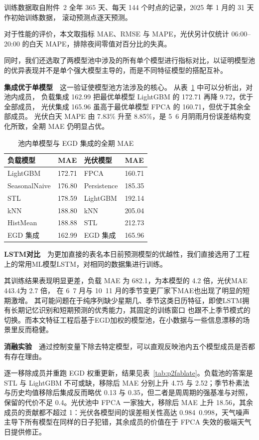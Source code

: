 \documentclass[zihao=-4,a4paper,fontset=none]{ctexart}
\begin{document}
训练数据取自附件~2 全年 365 天、每天 144 个时点的记录，2025 年 1 月的 31 天作初始训练数据，
滚动预测点逐天预测。

对于性能的评价，本文取指标 MAE、RMSE 与 MAPE，光伏另计仅统计 06:00--20:00 的白天 MAPE，排除夜间零值对百分比的失真。

同时，我们还选取了两模型池中涉及的所有单个模型进行指标对比，以证明模型池的优异表现并不是单个强大模型主导的，而是不同特征模型的搭配互补。

\textbf{集成优于单模型}\ \ 这一验证使模型池方法涉及的核心。
从表~\ref{tab:p2fsingle} 中可以分析出，对池内成员，
负载集成 162.99 把最优单模型 LightGBM 的 172.71 再降 9.72，优于全部成员，
光伏集成 165.96 虽高于最优单模型 FPCA 的 160.71，但优于其余全部成员。
光伏白天 MAPE 由 7.83\% 升至 8.85\%，是 5~6 月阴雨月份误差结构变化所致，全期 MAE 仍明显占优。

\begin{table}[htbp]
\centering
\caption{池内单模型与 EGD 集成的全期 MAE}
{\small
\begin{tabular}{lclc}
\toprule
负载模型 & MAE & 光伏模型 & MAE \\
\midrule
LightGBM & 172.71 & FPCA & 160.71 \\
SeasonalNaive & 176.80 & Persistence & 185.35 \\
STL & 178.59 & LightGBM & 192.14 \\
kNN & 188.80 & kNN & 205.04 \\
HistMean & 188.88 & STL & 212.73 \\
\midrule
EGD 集成 & 162.99 & EGD 集成 & 165.96 \\
\bottomrule
\end{tabular}}
\label{tab:p2fsingle}
\end{table}

\textbf{LSTM对比}\ \ 为更加直接的表名本日前预测模型的优越性，我们直接选用了工程上的常用ML模型LSTM，对相同的数据集进行训练。

其训练结果表现明显更差，负载 MAE 为 682.1，为本模型的 4.2 倍，光伏MAE 443.4为 2.7 倍，
在 6~7 月与 10~11 月的季节变更厂家下MAE也出现了明显的短期激增。
其可能问题在于纯序列缺少星期几、季节这类日历特征，即使LSTM拥有长期记忆识别和短期预测的优秀能力，其固定的训练窗口
也跟不上季节模式的切换。而本文特征工程后基于EGD加权的模型池，在小数据与一些信息漂移的场景里反而稳健。

\textbf{消融实验}\ \ 通过控制变量下除去特定模型，可以直观反映池内五个模型成员是否都有存在理由。

逐一移除成员并重跑 EGD 权重更新，结果见表~\ref{tab:p2fablate}。负载池的答案是 STL 与 LightGBM 不可或缺，移除后 MAE 分别上升 4.75 与 2.52；季节朴素法与历史均值移除后集成反而略优 0.13 与 0.35，但二者是周周期的强基准与对照，保留的代价不足 0.4。光伏池中 FPCA 一家独大，移除后 MAE 上升 18.56，其余成员的贡献都不超过 1：光伏各模型间的误差相关性高达 0.984~0.998，天气噪声主导下所有模型在同样的日子犯错，其余成员的价值在于 FPCA 失效的极端天气日提供修正。
\end{document}
